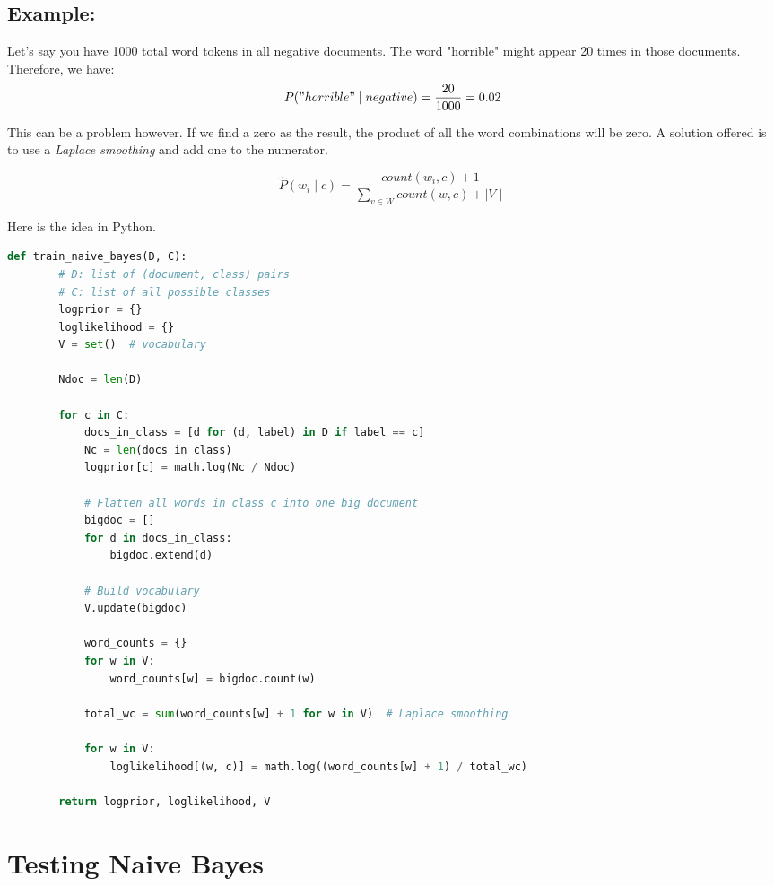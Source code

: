 \documentclass{article}
\begin{document}
\subsection{Example:}
Let's say you have 1000 total word tokens in all negative documents. The word "horrible" might appear 20 times in those documents.
Therefore, we have:
\[
    P("horrible" \mid negative) = \frac{20}{1000} = 0.02
\]

This can be a problem however. If we find a zero as the result, the product of all the word combinations will be zero. A solution offered is to
use a \textit{Laplace smoothing} and add one to the numerator.

\[
    \hat{P}(w_i \mid c) = \frac{count(w_i, c) + 1}{\sum_{v \in W}{count(w,c) + \mid V \mid}}
\]


Here is the idea in Python.

\begin{lstlisting}[language=Python]
    def train_naive_bayes(D, C):
        # D: list of (document, class) pairs
        # C: list of all possible classes
        logprior = {}
        loglikelihood = {}
        V = set()  # vocabulary
    
        Ndoc = len(D)
    
        for c in C:
            docs_in_class = [d for (d, label) in D if label == c]
            Nc = len(docs_in_class)
            logprior[c] = math.log(Nc / Ndoc)
    
            # Flatten all words in class c into one big document
            bigdoc = []
            for d in docs_in_class:
                bigdoc.extend(d)
            
            # Build vocabulary
            V.update(bigdoc)
    
            word_counts = {}
            for w in V:
                word_counts[w] = bigdoc.count(w)
    
            total_wc = sum(word_counts[w] + 1 for w in V)  # Laplace smoothing
    
            for w in V:
                loglikelihood[(w, c)] = math.log((word_counts[w] + 1) / total_wc)
    
        return logprior, loglikelihood, V
    \end{lstlisting}



\section*{Testing Naive Bayes}
\end{document}
